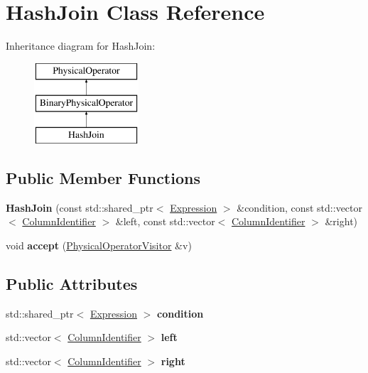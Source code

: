 \hypertarget{class_hash_join}{\section{Hash\+Join Class Reference}
\label{class_hash_join}
}
Inheritance diagram for Hash\+Join\+:\begin{figure}[H]
\begin{center}
\leavevmode
\includegraphics[height=3.000000cm]{class_hash_join}
\end{center}
\end{figure}
\subsection*{Public Member Functions}
\begin{DoxyCompactItemize}
\item 
\hypertarget{class_hash_join_aa07baceba7a4436481b76f4c5210f39d}{{\bfseries Hash\+Join} (const std\+::shared\+\_\+ptr$<$ \hyperlink{class_expression}{Expression} $>$ \&condition, const std\+::vector$<$ \hyperlink{class_column_identifier}{Column\+Identifier} $>$ \&left, const std\+::vector$<$ \hyperlink{class_column_identifier}{Column\+Identifier} $>$ \&right)}\label{class_hash_join_aa07baceba7a4436481b76f4c5210f39d}

\item 
\hypertarget{class_hash_join_a11dc03e38397ff42352772a3c759e145}{void {\bfseries accept} (\hyperlink{class_physical_operator_visitor}{Physical\+Operator\+Visitor} \&v)}\label{class_hash_join_a11dc03e38397ff42352772a3c759e145}

\end{DoxyCompactItemize}
\subsection*{Public Attributes}
\begin{DoxyCompactItemize}
\item 
\hypertarget{class_hash_join_ac2524a0455d2379287a55d8cb148c40d}{std\+::shared\+\_\+ptr$<$ \hyperlink{class_expression}{Expression} $>$ {\bfseries condition}}\label{class_hash_join_ac2524a0455d2379287a55d8cb148c40d}

\item 
\hypertarget{class_hash_join_a042d26672ea770645e428d4a2828ef24}{std\+::vector$<$ \hyperlink{class_column_identifier}{Column\+Identifier} $>$ {\bfseries left}}\label{class_hash_join_a042d26672ea770645e428d4a2828ef24}

\item 
\hypertarget{class_hash_join_a92d3fbbb90a427c9d48f2aca03cd9552}{std\+::vector$<$ \hyperlink{class_column_identifier}{Column\+Identifier} $>$ {\bfseries right}}\label{class_hash_join_a92d3fbbb90a427c9d48f2aca03cd9552}

\end{DoxyCompactItemize}


